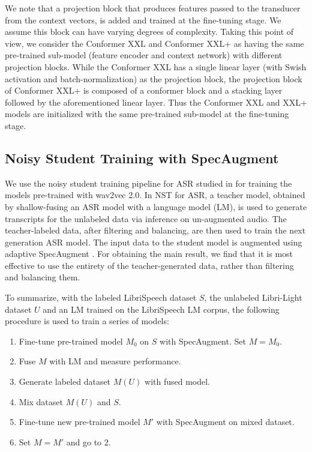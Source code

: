 \documentclass[dvipsnames]{article}
\begin{document}
We note that a projection block that produces features passed to the transducer from the context vectors, is added and trained at the fine-tuning stage. We assume this block can have varying degrees of complexity. Taking this point of view, we consider the Conformer XXL and Conformer XXL+ as having the same pre-trained sub-model (feature encoder and context network) with different projection blocks. While the Conformer XXL has a single linear layer (with Swish activation and batch-normalization) as the projection block, the projection block of Conformer XXL+ is composed of a conformer block and a stacking layer followed by the aforementioned linear layer. Thus the Conformer XXL and XXL+ models are initialized with the same pre-trained sub-model at the fine-tuning stage.

\subsection{Noisy Student Training with SpecAugment} \label{ss:nst}

We use the noisy student training pipeline for ASR studied in \cite{nstasr} for training the models pre-trained with wav2vec 2.0. In NST for ASR, a teacher model, obtained by shallow-fusing \cite{shallowfusion} an ASR model with a language model (LM), is used to generate transcripts for the unlabeled data via inference on un-augmented audio. The teacher-labeled data, after filtering and balancing, are then used to train the next generation ASR model. The input data to the student model is augmented using adaptive SpecAugment \cite{specaugment,specaugment2}. For obtaining the main result, we find that it is most effective to use the entirety of the teacher-generated data, rather than filtering and balancing them.

To summarize, with the labeled LibriSpeech dataset $S$, the unlabeled Libri-Light dataset $U$ and an LM trained on the LibriSpeech LM corpus, the following procedure is used to train a series of models:
\begin{enumerate}
\item Fine-tune pre-trained model $M_0$ on $S$ with SpecAugment. Set $M = M_0$.
\item Fuse $M$ with LM and measure performance.
\item Generate labeled dataset $M(U)$ with fused model.
\item Mix dataset $M(U)$ and $S$.
\item Fine-tune new pre-trained model $M'$ with SpecAugment on mixed dataset.
\item Set $M = M'$ and go to 2.
\end{enumerate}
\end{document}
